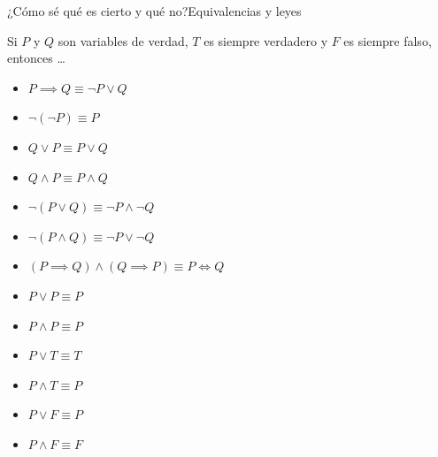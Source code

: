 \documentclass[spanish, c]{beamer}
\begin{document}
\begin{frame}{¿Cómo sé qué es cierto y qué no?}{Equivalencias y leyes}

    Si $P$ y $Q$ son variables de verdad, $T$ es siempre verdadero y $F$ es siempre falso, entonces \dots \pause

    \begin{itemize}[<+->]
        \item $P \implies Q \equiv \neg P \vee Q$
        \item $\neg(\neg P) \equiv P$
        \item $Q \vee P \equiv P \vee Q$
        \item $Q \wedge P \equiv P \wedge Q$
        \item $\neg(P \vee Q) \equiv \neg P \wedge \neg Q$
        \item $\neg(P \wedge Q) \equiv \neg P \vee \neg Q$
        \item $(P \implies Q) \wedge (Q \implies P) \equiv P \iff Q$
        \item $P \vee P \equiv P$
        \item $P \wedge P \equiv P$
        \item $P \vee T \equiv T$
        \item $P \wedge T \equiv P$
        \item $P \vee F \equiv P$
        \item $P \wedge F \equiv F$
    \end{itemize}

\end{frame}




\end{document}
